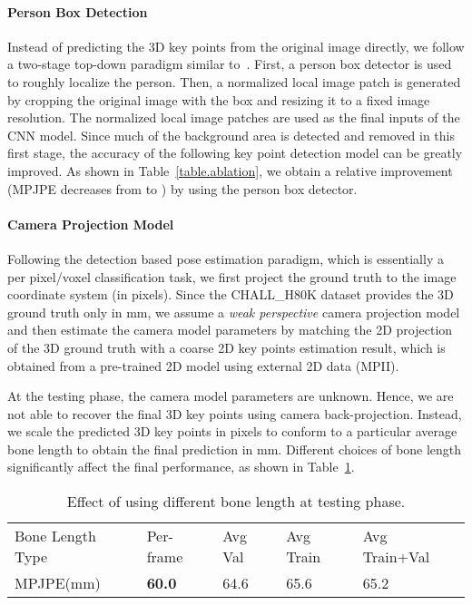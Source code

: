 \documentclass[runningheads]{llncs}
\begin{document}
\paragraph{\textbf{Person Box Detection}} Instead of predicting the 3D key points from the original image directly, we follow a two-stage top-down paradigm similar to~\cite{sun2017integral,papandreou2017towards}. First, a person box detector is used to roughly localize the person. Then, a normalized local image patch is generated by cropping the original image with the box and resizing it to a fixed image resolution. The normalized local image patches are used as the final inputs of the CNN model. Since much of the background area is detected and removed in this first stage, the accuracy of the following key point detection model can be greatly improved. As shown in Table~\ref{table.ablation}, we obtain a  relative improvement (MPJPE decreases from  to ) by using the person box detector.

\paragraph{\textbf{Camera Projection Model}} 
Following the detection based pose estimation paradigm, which is essentially a per pixel/voxel classification task, we first project the ground truth to the image coordinate system (in pixels). Since the CHALL\_H80K dataset provides the 3D ground truth only in mm, we assume a \emph{weak perspective} camera projection model and then estimate the camera model parameters by matching the 2D projection of the 3D ground truth with a coarse 2D key points estimation result, which is obtained from a pre-trained 2D model using external 2D data (MPII). 

At the testing phase, the camera model parameters are unknown. Hence, we are not able to recover the final 3D key points using camera back-projection. Instead, we scale the predicted 3D key points in pixels to conform to a particular average bone length to obtain the final prediction in mm. Different choices of bone length significantly affect the final performance, as shown in Table~\ref{table.bone_length}. 

\begin{table}
\caption{Effect of using different bone length at testing phase.}
\begin{center}
\begin{tabular}{l | l | l | l | l}
\hline
Bone Length Type& Per-frame & Avg Val 	& Avg Train & Avg Train+Val \\
MPJPE(mm) 	& \textbf{60.0} &  64.6	& 65.6	& 65.2 \\
\hline
\end{tabular}
\end{center}
\label{table.bone_length}
\end{table}
\end{document}
